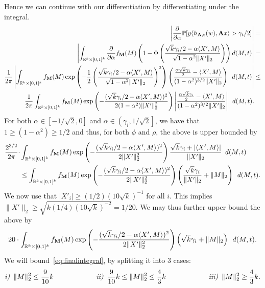 Hence we can continue with our differentiation by differentiating under the integral.
\begin{align*}
    \bigg| \frac{\partial}{\partial\alpha}\Pr[y \ipr{h_{\rA,\rt}(w),\rA x}> \gamma_i/2 ] \bigg| 
    &= \\\left| \int_{\R^k\times[0,1]^k} \dfrac{\partial}{\partial\alpha}f_{\rM}(M)\left(1-\Phi\left(\frac{\sqrt{k}\gamma_i/2 - \alpha\ipr{X',M}}{\sqrt{1-\alpha^2}\norm{X'}_2}\right)\right) d(M,t) \right| 
    &= \\ \frac{1}{2\pi}\left| \int_{\R^k\times[0,1]^k} f_{\rM}(M)\exp\left(-\frac{1}{2}\left(\frac{\sqrt{k}\gamma_i/2 - \alpha\ipr{X',M}}{\sqrt{1-\alpha^2}\norm{X'}_2}\right)^2 \right)\left(\frac{\frac{\alpha\sqrt{k}\gamma_i}{2} - \ipr{X',M}}{(1-\alpha^2)^{3/2}\norm{X'}_2}\right) \enspace d(M,t) \right|
    &\le \\ \frac{1}{2\pi}\int_{\R^k\times[0,1]^k} f_{\rM}(M)\exp\left(-\frac{(\sqrt{k}\gamma_i/2 - \alpha\ipr{X',M})^2}{2(1-\alpha^2)\norm{X'}_2^2}\right)\left|\frac{\frac{\alpha\sqrt{k}\gamma_i}{2} - \ipr{X',M}}{(1-\alpha^2)^{3/2}\norm{X'}_2} \right| \enspace d(M,t).
\end{align*}
For both $\alpha \in [-1/\sqrt{2}, 0]$ and $\alpha \in \left(\gamma_i, 1/\sqrt{2}\right]$, we have that $1\ge (1-\alpha^2) \geq 1/2$ and thus, for both $\phi$ and $\rho$, the above is upper bounded by
\begin{align*}
\frac{2^{3/2}}{2 \pi} \cdot &\int_{\R^k\times[0,1]^k} f_{\rM}(M)\exp\left(-\frac{(\sqrt{k}\gamma_i/2 - \alpha\ipr{X',M})^2}{2\norm{X'}_2^2}\right)\frac{\sqrt{k}\gamma_i + \left|\ipr{X',M}\right| }{\norm{X'}_2} \enspace d(M,t)  \\
&\le
\int_{\R^k\times[0,1]^k} f_{\rM}(M)\exp\left(-\frac{(\sqrt{k}\gamma_i/2 - \alpha\ipr{X',M})^2}{2\norm{X'}_2^2}\right)\left(\frac{\sqrt{k}\gamma_i}{\norm{X'}_2} + \|M\|_2 \right)\enspace d(M,t).
\end{align*}
We now use that $|X'_i| \geq (1/2)(10 \sqrt{k})^{-1}$ for all $i$. This implies $\|X'\|_2 \geq \sqrt{k (1/4)(10 \sqrt{k})^{-2}} = 1/20$. We may thus further upper bound the above by
\begin{align}
20 \cdot \int_{\R^k\times[0,1]^k} f_{\rM}(M)\exp\left(-\frac{(\sqrt{k}\gamma_i/2 - \alpha\ipr{X',M})^2}{2\norm{X'}_2^2}\right)\left(\sqrt{k}\gamma_i + \|M\|_2 \right)\enspace d(M,t).\label{eq:finalintegral}
\end{align}
We will bound~\eqref{eq:finalintegral}, by splitting it into 3 cases: 
\begin{align*}
\textit{i)}\enspace\norm{M}_2^2\le \frac{9}{10}k\qquad\qquad\qquad
\textit{ii)}\enspace\frac{9}{10}k\le\norm{M}_2^2\le \frac{4}{3}k\qquad\qquad\qquad
\textit{iii)}\enspace\norm{M}_2^2\ge \frac{4}{3}k.
\end{align*}
